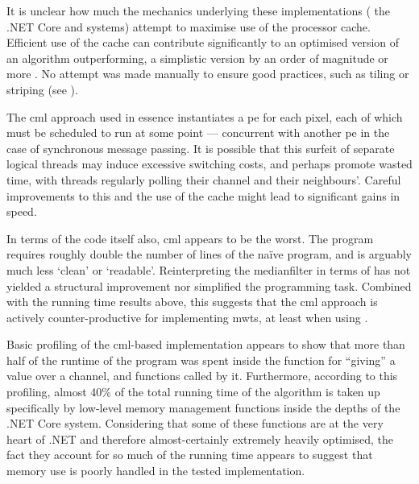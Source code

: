 It is unclear how much the mechanics underlying these implementations (\ie{} the .NET Core and \hopac{} systems) attempt to maximise use of the processor cache.  Efficient use of the cache can contribute significantly to an optimised version of an algorithm outperforming, a simplistic version by an order of magnitude or more \cite{Ragan-Kelley2017}.  No attempt was made manually to ensure good practices, such as tiling or striping (see \eg{} \cite{Midkiff2012}).

The \gls{cml} approach used in essence instantiates a \gls{pe} for each pixel, each of which must be scheduled to run at some point --- concurrent with another \gls{pe} in the case of synchronous message passing.  It is possible that this surfeit of separate logical threads may induce excessive switching costs, and perhaps promote wasted time, with threads regularly polling their channel and their neighbours'.  Careful improvements to this and the use of the cache might lead to significant gains in speed.

In terms of the code itself also, \gls{cml} appears to be the worst.  The program requires roughly double the number of lines of the naïve program, and is arguably much less `clean' or `readable'.  Reinterpreting the \gls{medianfilter} in terms of  has not yielded a structural improvement nor simplified the programming task.  Combined with the running time results above, this suggests that the \gls{cml} approach is actively counter-productive for implementing \glspl{mwt}, at least when using \hopac{}.


Basic profiling of the \gls{cml}-based implementation appears to show that more than half of the runtime of the program was spent inside the function for ``giving'' a value over a channel, and functions called by it.  Furthermore, according to this profiling, almost 40\% of the total running time of the algorithm is taken up specifically by low-level memory management functions inside the depths of the .NET Core system.  Considering that some of these functions are at the very heart of .NET and therefore almost-certainly extremely heavily optimised, the fact they account for so much of the running time appears to suggest that memory use is poorly handled in the tested implementation.

